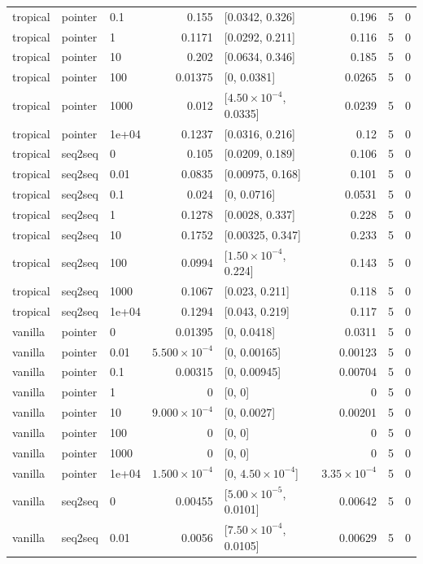 \documentclass[10pt]{article}
\begin{document}
{\begin{longtable}{lllrlrrr}
tropical & pointer & 0.1 & 0.155 & [0.0342, 0.326] & 0.196 & 5 & 0\\
tropical & pointer & 1 & 0.1171 & [0.0292, 0.211] & 0.116 & 5 & 0\\
tropical & pointer & 10 & 0.202 & [0.0634, 0.346] & 0.185 & 5 & 0\\
tropical & pointer & 100 & 0.01375 & [0, 0.0381] & 0.0265 & 5 & 0\\
tropical & pointer & 1000 & 0.012 & [$4.50\times10^{-4}$, 0.0335] & 0.0239 & 5 & 0\\
tropical & pointer & 1e+04 & 0.1237 & [0.0316, 0.216] & 0.12 & 5 & 0\\
tropical & seq2seq & 0 & 0.105 & [0.0209, 0.189] & 0.106 & 5 & 0\\
tropical & seq2seq & 0.01 & 0.0835 & [0.00975, 0.168] & 0.101 & 5 & 0\\
tropical & seq2seq & 0.1 & 0.024 & [0, 0.0716] & 0.0531 & 5 & 0\\
tropical & seq2seq & 1 & 0.1278 & [0.0028, 0.337] & 0.228 & 5 & 0\\
tropical & seq2seq & 10 & 0.1752 & [0.00325, 0.347] & 0.233 & 5 & 0\\
tropical & seq2seq & 100 & 0.0994 & [$1.50\times10^{-4}$, 0.224] & 0.143 & 5 & 0\\
tropical & seq2seq & 1000 & 0.1067 & [0.023, 0.211] & 0.118 & 5 & 0\\
tropical & seq2seq & 1e+04 & 0.1294 & [0.043, 0.219] & 0.117 & 5 & 0\\
vanilla & pointer & 0 & 0.01395 & [0, 0.0418] & 0.0311 & 5 & 0\\
vanilla & pointer & 0.01 & $5.500\times10^{-4}$ & [0, 0.00165] & 0.00123 & 5 & 0\\
vanilla & pointer & 0.1 & 0.00315 & [0, 0.00945] & 0.00704 & 5 & 0\\
vanilla & pointer & 1 & 0 & [0, 0] & 0 & 5 & 0\\
vanilla & pointer & 10 & $9.000\times10^{-4}$ & [0, 0.0027] & 0.00201 & 5 & 0\\
vanilla & pointer & 100 & 0 & [0, 0] & 0 & 5 & 0\\
vanilla & pointer & 1000 & 0 & [0, 0] & 0 & 5 & 0\\
vanilla & pointer & 1e+04 & $1.500\times10^{-4}$ & [0, $4.50\times10^{-4}$] & $3.35\times10^{-4}$ & 5 & 0\\
vanilla & seq2seq & 0 & 0.00455 & [$5.00\times10^{-5}$, 0.0101] & 0.00642 & 5 & 0\\
vanilla & seq2seq & 0.01 & 0.0056 & [$7.50\times10^{-4}$, 0.0105] & 0.00629 & 5 & 0\\

\end{longtable}}
\end{document}
